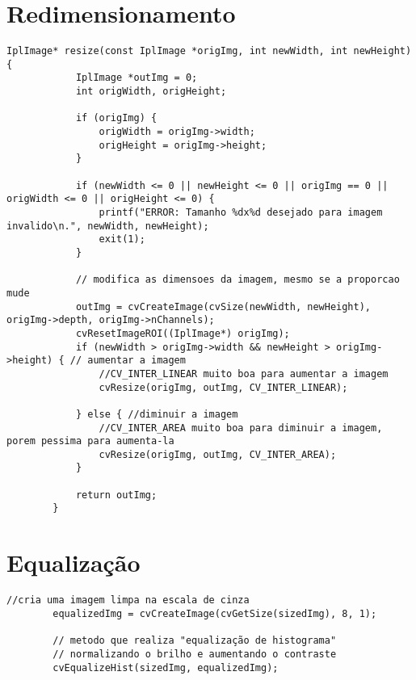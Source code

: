 \section{Redimensionamento}

	\begin{lstlisting}[caption=Redimensionamento de uma imagem., label=list:resize]
		IplImage* resize(const IplImage *origImg, int newWidth, int newHeight) {
			IplImage *outImg = 0;
			int origWidth, origHeight;

			if (origImg) {
				origWidth = origImg->width;
				origHeight = origImg->height;
			}

			if (newWidth <= 0 || newHeight <= 0 || origImg == 0 || origWidth <= 0 || origHeight <= 0) {
				printf("ERROR: Tamanho %dx%d desejado para imagem invalido\n.", newWidth, newHeight);
				exit(1);
			}

			// modifica as dimensoes da imagem, mesmo se a proporcao mude
			outImg = cvCreateImage(cvSize(newWidth, newHeight), origImg->depth, origImg->nChannels);
			cvResetImageROI((IplImage*) origImg);
			if (newWidth > origImg->width && newHeight > origImg->height) { // aumentar a imagem
				//CV_INTER_LINEAR muito boa para aumentar a imagem
				cvResize(origImg, outImg, CV_INTER_LINEAR); 

			} else { //diminuir a imagem
				//CV_INTER_AREA muito boa para diminuir a imagem, porem pessima para aumenta-la
				cvResize(origImg, outImg, CV_INTER_AREA);
			}

			return outImg;
		}
	\end{lstlisting}

\section{Equalização}

	\begin{lstlisting}[caption=Equalização de uma imagem., label=list:equalizacao]
		//cria uma imagem limpa na escala de cinza
		equalizedImg = cvCreateImage(cvGetSize(sizedImg), 8, 1); 

		// metodo que realiza "equalização de histograma"
		// normalizando o brilho e aumentando o contraste
		cvEqualizeHist(sizedImg, equalizedImg);
	\end{lstlisting}	









